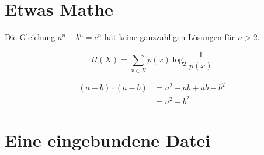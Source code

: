 \documentclass[a4paper]{article}
\begin{document}
\section{Etwas Mathe}
Die Gleichung $a^n + b^n = c^n$ hat keine ganzzahligen Lösungen für $ n > 2$.

\begin{equation*}
H(X) = \sum_{x \in X} p(x) \log_2 \frac{1}{p(x)}
\end{equation*}

\begin{align*}
  (a + b) \cdot (a - b)
  &= a^2 - ab + ab - b^2 \\
  &= a^2 - b^2
\end{align*}

\section{Eine eingebundene Datei}

\end{document}
